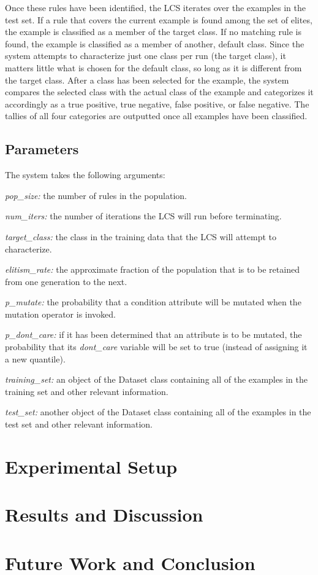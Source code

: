 \documentclass[11pt]{article}
\begin{document}
Once these rules have been identified, the LCS iterates over the examples in the test set. If a rule that covers the current example is found among the set of elites, the example is classified as a member of the target class. If no matching rule is found, the example is classified as a member of another, default class. Since the system attempts to characterize just one class per run (the target class), it matters little what is chosen for the default class, so long as it is different from the target class. After a class has been selected for the example, the system compares the selected class with the actual class of the example and categorizes it accordingly as a true positive, true negative, false positive, or false negative. The tallies of all four categories are outputted once all examples have been classified.

\subsection{Parameters}

The system takes the following arguments:

\begin{description}
\item \textit{pop\_size:} the number of rules in the population.
\item \textit{num\_iters:} the number of iterations the LCS will run before terminating.
\item \textit{target\_class:} the class in the training data that the LCS will attempt to characterize.
\item \textit{elitism\_rate:} the approximate fraction of the population that is to be retained from one generation to the next.
\item \textit{p\_mutate:} the probability that a condition attribute will be mutated when the mutation operator is invoked.
\item \textit{p\_dont\_care:} if it has been determined that an attribute is to be mutated, the probability that its \textit{dont\_care} variable will be set to true (instead of assigning it a new quantile).
\item \textit{training\_set:} an object of the Dataset class containing all of the examples in the training set and other relevant information.
\item \textit{test\_set:} another object of the Dataset class containing all of the examples in the test set and other relevant information.
\end{description}

\section{Experimental Setup}
\section{Results and Discussion}
\section{Future Work and Conclusion}



\end{document}
